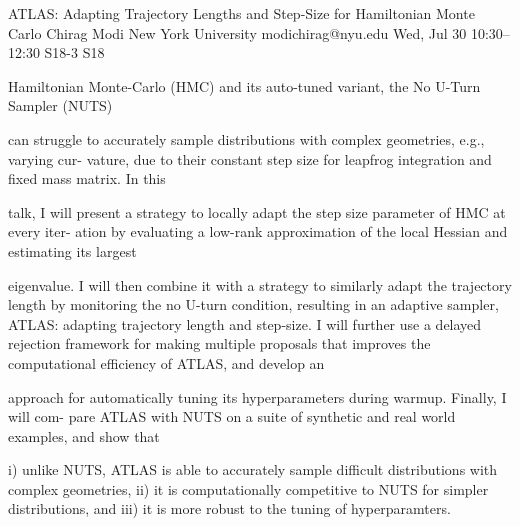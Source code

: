 \begin{talk}
  {ATLAS: Adapting Trajectory Lengths and Step-Size for Hamiltonian Monte Carlo}%
  {Chirag Modi}%
  {New York University}%
  {modichirag@nyu.edu}%
  {}%
  {}%
  {Wed, Jul 30 10:30–12:30}%
  {S18-3}%
  {S18}%
  {}%
  
				

Hamiltonian Monte-Carlo (HMC) and its auto-tuned variant, the No U-Turn Sampler (NUTS)

can struggle to accurately sample distributions with complex geometries, e.g., varying cur-
vature, due to their constant step size for leapfrog integration and fixed mass matrix. In this

talk, I will present a strategy to locally adapt the step size parameter of HMC at every iter-
ation by evaluating a low-rank approximation of the local Hessian and estimating its largest

eigenvalue. I will then combine it with a strategy to similarly adapt the trajectory length
by monitoring the no U-turn condition, resulting in an adaptive sampler, ATLAS: adapting
trajectory length and step-size. I will further use a delayed rejection framework for making
multiple proposals that improves the computational efficiency of ATLAS, and develop an

approach for automatically tuning its hyperparameters during warmup. Finally, I will com-
pare ATLAS with NUTS on a suite of synthetic and real world examples, and show that

i) unlike NUTS, ATLAS is able to accurately sample difficult distributions with complex
geometries, ii) it is computationally competitive to NUTS for simpler distributions, and iii)
it is more robust to the tuning of hyperparamters.
\medskip

\end{talk}

